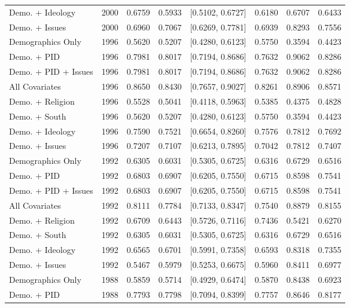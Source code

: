 \begin{longtable}{lrrrlrrr}
  Demo. + Ideology & 2000 & 0.6759 & 0.5933 & [0.5102, 0.6727] & 0.6180 & 0.6707 & 0.6433 \\ 
  Demo. + Issues & 2000 & 0.6960 & 0.7067 & [0.6269, 0.7781] & 0.6939 & 0.8293 & 0.7556 \\ 
  Demographics Only & 1996 & 0.5620 & 0.5207 & [0.4280, 0.6123] & 0.5750 & 0.3594 & 0.4423 \\ 
  Demo. + PID & 1996 & 0.7981 & 0.8017 & [0.7194, 0.8686] & 0.7632 & 0.9062 & 0.8286 \\ 
  Demo. + PID + Issues & 1996 & 0.7981 & 0.8017 & [0.7194, 0.8686] & 0.7632 & 0.9062 & 0.8286 \\ 
  All Covariates & 1996 & 0.8650 & 0.8430 & [0.7657, 0.9027] & 0.8261 & 0.8906 & 0.8571 \\ 
  Demo. + Religion & 1996 & 0.5528 & 0.5041 & [0.4118, 0.5963] & 0.5385 & 0.4375 & 0.4828 \\ 
  Demo. + South & 1996 & 0.5620 & 0.5207 & [0.4280, 0.6123] & 0.5750 & 0.3594 & 0.4423 \\ 
  Demo. + Ideology & 1996 & 0.7590 & 0.7521 & [0.6654, 0.8260] & 0.7576 & 0.7812 & 0.7692 \\ 
  Demo. + Issues & 1996 & 0.7207 & 0.7107 & [0.6213, 0.7895] & 0.7042 & 0.7812 & 0.7407 \\ 
  Demographics Only & 1992 & 0.6305 & 0.6031 & [0.5305, 0.6725] & 0.6316 & 0.6729 & 0.6516 \\ 
  Demo. + PID & 1992 & 0.6803 & 0.6907 & [0.6205, 0.7550] & 0.6715 & 0.8598 & 0.7541 \\ 
  Demo. + PID + Issues & 1992 & 0.6803 & 0.6907 & [0.6205, 0.7550] & 0.6715 & 0.8598 & 0.7541 \\ 
  All Covariates & 1992 & 0.8111 & 0.7784 & [0.7133, 0.8347] & 0.7540 & 0.8879 & 0.8155 \\ 
  Demo. + Religion & 1992 & 0.6709 & 0.6443 & [0.5726, 0.7116] & 0.7436 & 0.5421 & 0.6270 \\ 
  Demo. + South & 1992 & 0.6305 & 0.6031 & [0.5305, 0.6725] & 0.6316 & 0.6729 & 0.6516 \\ 
  Demo. + Ideology & 1992 & 0.6565 & 0.6701 & [0.5991, 0.7358] & 0.6593 & 0.8318 & 0.7355 \\ 
  Demo. + Issues & 1992 & 0.5467 & 0.5979 & [0.5253, 0.6675] & 0.5960 & 0.8411 & 0.6977 \\ 
  Demographics Only & 1988 & 0.5859 & 0.5714 & [0.4929, 0.6474] & 0.5870 & 0.8438 & 0.6923 \\ 
  Demo. + PID & 1988 & 0.7793 & 0.7798 & [0.7094, 0.8399] & 0.7757 & 0.8646 & 0.8177 \\ 

\end{longtable}

